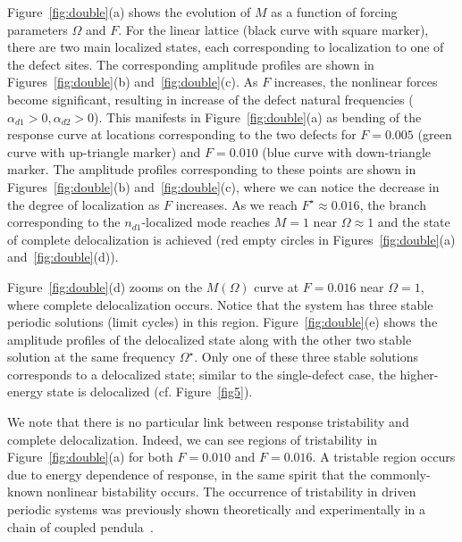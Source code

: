 \documentclass[aps,pre,twocolumn,groupedaddress]{revtex4-1}
\begin{document}
Figure~\ref{fig:double}(a) shows the evolution of $M$ as a function of forcing parameters $\Omega$ and $F$. For the linear lattice {\color{black}(black curve with square marker)}, there are two main localized states, each corresponding to localization to one of the defect sites. The corresponding amplitude profiles are shown in Figures~\ref{fig:double}(b) and~\ref{fig:double}(c). As $F$ increases, the nonlinear forces become significant, resulting in increase of the defect natural frequencies ($\alpha_{d1}\!>\!0,\alpha_{d2}\!>\!0$). This manifests in Figure~\ref{fig:double}(a) as bending of the response curve at locations corresponding to the two defects {\color{black}for $F=0.005$ (green curve with up-triangle marker) and $F=0.010$ (blue curve with down-triangle marker}. The amplitude profiles corresponding to these points are shown in Figures~\ref{fig:double}(b) and~\ref{fig:double}(c), where we can notice the decrease in the degree of localization as $F$ increases. As we reach $F^{\star} \approx 0.016$, the branch corresponding to the $n_{d1}$-localized mode reaches $M=1$ near $\Omega \approx 1$ and the state of complete delocalization is achieved {\color{black}(red empty circles in Figures~\ref{fig:double}(a) and~\ref{fig:double}(d))}.

Figure~\ref{fig:double}(d) zooms on the $M(\Omega)$ curve at $F=0.016$ near $\Omega=1$, where complete delocalization occurs. Notice that the system has three stable periodic solutions (limit cycles) in this region. Figure~\ref{fig:double}(e) shows the amplitude profiles of the delocalized state along with the other two stable solution at the same frequency $\Omega^{\star}$. Only one of these three stable solutions corresponds to a delocalized state; similar to the single-defect case, the higher-energy state is delocalized (cf. Figure~\ref{fig5}). 

We note that there is no particular link between response tristability and complete delocalization. Indeed, we can see regions of tristability in Figure~\ref{fig:double}(a) for both $F=0.010$ and $F=0.016$. A tristable region occurs due to energy dependence of response, in the same spirit that the commonly-known nonlinear bistability occurs. 
The occurrence of tristability in driven periodic systems was previously shown theoretically and experimentally in a chain of coupled pendula~\cite{tristability}. 
\end{document}
